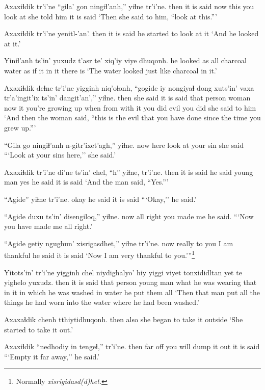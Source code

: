 \documentclass[12pt]{article}
\begin{document}
\gll Axaxiɬdik tr'i'ne ``gila' gon ningiɬ'anh,'' yiɬne  tr'i'ne.
then  {it is said} now this {you look at}  {she told him} {it is said}
\glt `Then she said to him, ``look at this.'''
\glend

\gll Axaxiɬdik tr'i'ne yenitl-'an'.
then  {it is said} {he started to look at it}
\glt `And he looked at it.'
\glend

\gll Yiniɬ'anh ts'in' yuxudz t'asr  te' xiq'iy viye dhuqonh.
{he looked} as all  charcoal water {as if it}  {in it} {there is}
\glt `The water looked just like charcoal in it.'
\glend

\gll Axaxiɬdik deɬne  tr'i'ne yigginh niq'oɬonh, ``gogide iy nongiyaɬ dong xuts'in' vaxa tr'a'ingit'ix ts'in' dangit'an',''  yiɬne.
then  {she said} {it is said} {that person}  woman now  it {you're growing up} when from {with it} {you did evil} {} {you did} {she said to him}
\glt `And then the woman said, ``this is the evil that you have done since the time you grew up.'''
\glend

\gll ``Gila go ningiɬ'anh n-gitr'ixet'agh,'' yiɬne.
now here {look at}  {your sin}  {she said}
\glt ```Look at your sins here,'' she said.'
\glend

\gll Axaxiɬdik tr'i'ne di'ne ts'in' chel, ``h'' yiɬne, tr'i'ne.
then  {it is said} {he said} {} {young man} yes {he said} {it is said} 
\glt `And the man said, ``Yes.'''
\glend

\gll ``Agide'' yiɬne  tr'i'ne. 
okay {he said} {it is said}
\glt ```Okay,'' he said.'
\glend

\gll ``Agide duxu ts'in' disengiloq,''  yiɬne.
now  {all right} {} {you made me} {he said.}
\glt ```Now you have made me all right.'
\glend 

\gll ``Agide getiy ngughun' xisrigasdhet,'' yiɬne  tr'i'ne.
now  really {to you} {I am thankful} {he said}  {it is said}
\glt `Now I am very thankful to you.'''\footnote{Normally \em xisrigidasd(d)het.}
\glend

\gll Yitots'in' tr'i'ne yigginh chel {niydighalyo' hiy} yiggi viyet tonxididltan yet te yighelo yuxudz.
then  {it is said} {that person} {young man} {what he was wearing} that {in it} {in which he was washed} in water {he put them}  all
\glt `Then that man put all the things he had worn into the water where he had been washed.'
\glend

\gll Axaxaɬdik chenh tthiytidhuqonh.
then  also {she began to take it outside}
\glt `She started to take it out.'
\glend

\gll Axaxiɬdik ``nedhodiy {in tengeɬ,''} tr'i'ne.
then  {far off} {you will dump it out} {it is said}
\glt ```Empty it far away,'' he said.'
\glend
\end{document}
